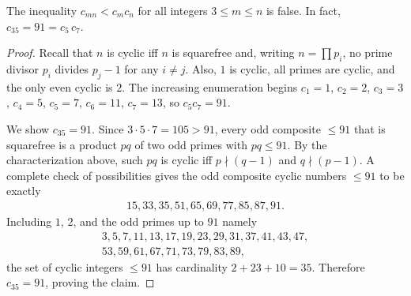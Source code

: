 \begin{theorem}\label{thm:panaitopol}
The inequality $c_{mn}<c_m c_n$ for all integers $3\le m\le n$ is false. In fact, $c_{35}=91=c_5\,c_7$.
\end{theorem}

\begin{proof}
Recall that $n$ is cyclic iff $n$ is squarefree and, writing $n=\prod p_i$, no prime divisor $p_i$ divides $p_j-1$ for any $i\ne j$. Also, $1$ is cyclic, all primes are cyclic, and the only even cyclic is $2$. The increasing enumeration begins $c_1=1$, $c_2=2$, $c_3=3$, $c_4=5$, $c_5=7$, $c_6=11$, $c_7=13$, so $c_5c_7=91$.

We show $c_{35}=91$. Since $3\cdot5\cdot7=105>91$, every odd composite $\le91$ that is squarefree is a product $pq$ of two odd primes with $pq\le91$. By the characterization above, such $pq$ is cyclic iff $p\nmid(q-1)$ and $q\nmid(p-1)$. A complete check of possibilities gives the odd composite cyclic numbers $\le91$ to be exactly
\[
\begin{gathered}
15,33,35,51,65,69,77,85,87,91.
\end{gathered}
\]
Including $1$, $2$, and the odd primes up to $91$ namely
\[
\begin{gathered}
3,5,7,11,13,17,19,23,29,31,37,41,43,47,\\
53,59,61,67,71,73,79,83,89,
\end{gathered}
\]
the set of cyclic integers $\le91$ has cardinality $2+23+10=35$. Therefore $c_{35}=91$, proving the claim.
\end{proof}
